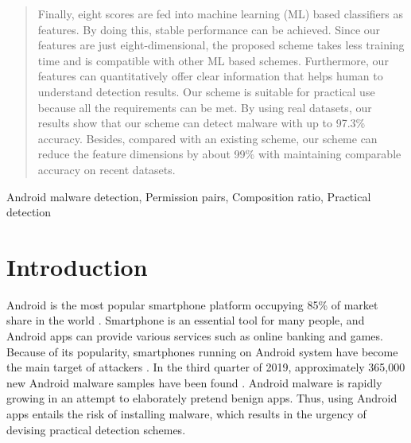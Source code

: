 \documentclass{ieeeaccess}
\begin{document}
\begin{abstract}
Finally, eight scores are fed into machine learning (ML) based classifiers as features.
By doing this, stable performance can be achieved.
Since our features are just eight-dimensional, the proposed scheme takes less training time and is compatible with other ML based schemes.
Furthermore, our features can quantitatively offer clear information that helps human to understand detection results.
Our scheme is suitable for practical use because all the requirements can be met.
By using real datasets, our results show that our scheme can detect malware with up to 97.3\% accuracy.
Besides, compared with an existing scheme, our scheme can reduce the feature dimensions by about 99\% with maintaining comparable accuracy on recent datasets.
\end{abstract}

\begin{keywords} 
 Android malware detection, Permission pairs, Composition ratio, Practical detection 
 \end{keywords}

\titlepgskip=-15pt

\maketitle

\section{Introduction}  \label{sec:introduction}
Android is the most popular smartphone platform occupying 85\% of market share in the world \cite{idc}.
Smartphone is an essential tool for many people, and Android apps can provide various services such as online banking and games.
Because of its popularity, smartphones running on Android system have become the main target of attackers \cite{saracino2016madam}.
In the third quarter of 2019, approximately 365,000 new Android malware samples have been found \cite{wang2020review}.
Android malware is rapidly growing in an attempt to elaborately pretend benign apps.
Thus, using Android apps entails the risk of installing malware, which results in the urgency of devising practical detection schemes.
\end{document}
